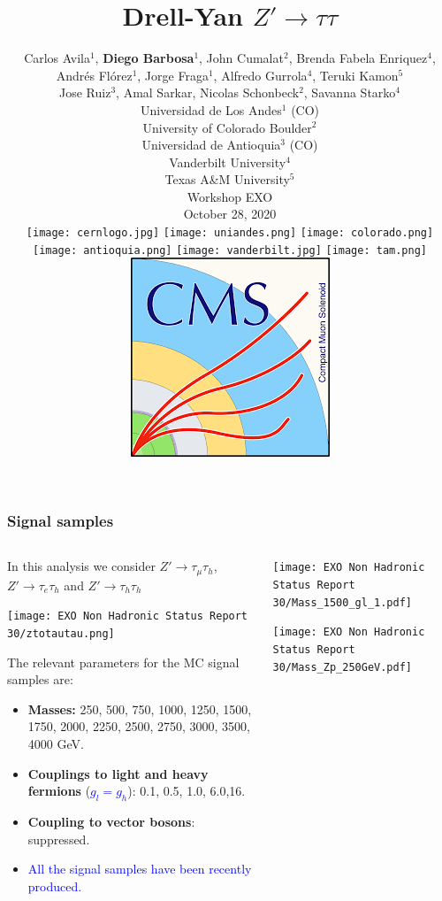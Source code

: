 \documentclass[8pt,xcolor=dvipsnames,xcolor=table]{beamer}
\title[ DY $Z'\rightarrow \tau\tau$] 
{Drell-Yan $Z'\rightarrow \tau\tau$}
\author[D. Barbosa (Universidad de los Andes)] 
{
Carlos Avila$^{1}$,  
\textbf{Diego Barbosa$^{1}$},
John Cumalat$^{2}$, 
Brenda Fabela Enriquez$^{4}$, \\
Andrés Flórez$^{1}$, 
Jorge Fraga$^{1}$, 
Alfredo Gurrola$^{4}$,  
Teruki Kamon$^{5}$ \\
Jose Ruiz$^{3}$,
Amal Sarkar, 
Nicolas Schonbeck$^{2}$,
Savanna Starko$^{4}$ \\
\medskip
{\footnotesize
Universidad de Los Andes$^{1}$ (CO)\\
 University of Colorado Boulder$^{2}$\\
 Universidad de Antioquia$^{3}$ (CO)\\
 Vanderbilt University$^{4}$\\
 Texas A\&M University$^{5}$ \\}
 \medskip
 {\large Workshop EXO}\\
 \medskip
 October 28, 2020 \\
 \medskip
\texttt{[image: cernlogo.jpg]} \qquad\qquad
\texttt{[image: uniandes.png]}
\texttt{[image: colorado.png]}
\texttt{[image: antioquia.png]}
\texttt{[image: vanderbilt.jpg]}
\texttt{[image: tam.png]} \qquad\qquad
\includegraphics[scale=0.11]{cmslogo}
}
\date{}
\begin{document}
\begin{frame}
\titlepage %
\end{frame}
\begin{frame}
\frametitle{Signal samples}

\begin{columns}

    \begin{column}{.45\textwidth}
    In this analysis we consider $Z'\rightarrow\tau_\mu\tau_h$, $Z'\rightarrow\tau_e\tau_h$ and $Z'\rightarrow\tau_h\tau_h$
    \begin{center}
    \texttt{[image: EXO Non Hadronic Status Report 30/ztotautau.png]}
    \end{center}
    \footnotesize
 The relevant parameters for the MC signal samples are:
 \begin{itemize}
    \item {\bf Masses:} 250, 500, 750, 1000, 1250, 1500, 1750, 2000, 2250, 2500, 2750, 3000, 3500, 4000 GeV.
    \item {\bf Couplings to light and heavy fermions} (\textcolor{blue}{$g_{l}=g_h$}): 0.1, 0.5, 1.0, 6.0,16. 
    \item {\bf  Coupling to vector bosons}: suppressed.
    \item \textcolor{blue}{ All the signal samples have been recently produced.}
\end{itemize}
\centering

\end{column}


      \begin{column}{.5\textwidth}

\centering

\texttt{[image: EXO Non Hadronic Status Report 30/Mass\_1500\_gl\_1.pdf]}

\medskip

\texttt{[image: EXO Non Hadronic Status Report 30/Mass\_Zp\_250GeV.pdf]}

    \end{column}
    
  \end{columns}

\end{frame}
\end{document}
